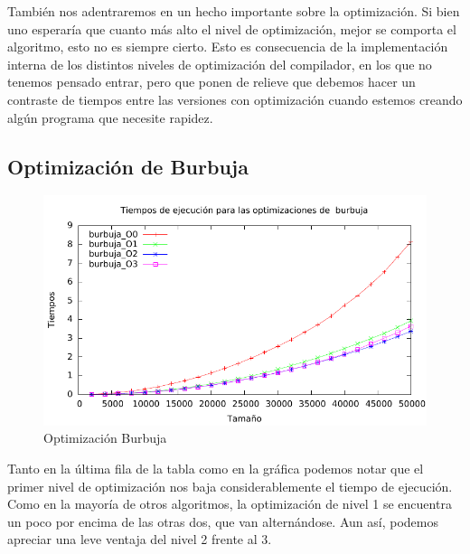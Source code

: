 \documentclass[a4paper, 11pt]{article}
\begin{document}
También nos adentraremos en un hecho importante sobre la optimización. Si bien uno esperaría que cuanto más alto el nivel de optimización, mejor se comporta el algoritmo, esto no es siempre cierto. Esto es consecuencia de la implementación interna de los distintos niveles de optimización del compilador, en los que no tenemos pensado entrar, pero que ponen de relieve que debemos hacer un contraste de tiempos entre las versiones con optimización cuando estemos creando algún programa que necesite rapidez.

\newpage
\subsection{Optimización de Burbuja}

\begin{figure}[H]\includegraphics[width=13cm]{img/burbuja_optim_g.pdf} \centering
	\caption{Optimización Burbuja}\end{figure}

Tanto en la última fila de la tabla como en la gráfica podemos notar que el primer nivel de optimización nos baja considerablemente el tiempo de ejecución. Como en la mayoría de otros algoritmos, la optimización de nivel 1 se encuentra un poco por encima de las otras dos, que van alternándose. Aun así, podemos apreciar una leve ventaja del nivel 2 frente al 3.

\newpage 
\end{document}
